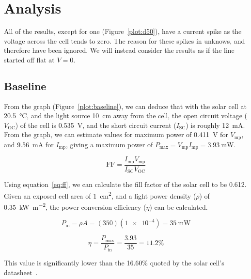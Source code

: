 \documentclass[a4paper,11pt]{article}
\begin{document}
\section{Analysis}

All of the results, except for one (Figure~\ref{plot:d50}), have a current spike as the voltage across the cell tends to zero. The reason for these spikes in unknows, and therefore have been ignored. We will instead consider the results as if the line started off flat at $V = 0$.

\subsection{Baseline}

From the graph (Figure~\ref{plot:baseline}), we can deduce that with the solar cell at \SI{20.5}{\celsius}, and the light source \SI{10}{\centi\metre} away from the cell, the open circuit voltage ($V_{\textrm{OC}}$) of the cell is \SI{0.535}{\volt}, and the short circuit current ($I_{\textrm{SC}}$) is roughly \SI{12}{\milli\ampere}. From the graph, we can estimate values for maximum power of \SI{0.411}{\volt} for $V_{\textrm{mp}}$, and \SI{9.56}{\milli\ampere} for $I_{\textrm{mp}}$, giving a maximum power of $P_{\textrm{max}} = V_{\textrm{mp}} I_{\textrm{mp}} = \SI{3.93}{\milli\watt}$.

\begin{equation} \label{eq:ff}
\textrm{FF} = \frac{I_{\textrm{mp}} V_{\textrm{mp}}}{I_{\textrm{SC}} V_{\textrm{OC}}}
\end{equation}

Using equation~\ref{eq:ff}, we can calculate the fill factor of the solar cell to be 0.612. Given an exposed cell area of \SI{1}{\centi\metre\squared}, and a light power density ($\rho$) of \SI{0.35}{\kilo\watt\per\metre\squared}, the power conversion efficiency ($\eta$) can be calculated.

\begin{displaymath}
P_{\textrm{in}} = \rho A
                = (350)(\num{1e-4})
                = \SI{35}{\milli\watt}
\end{displaymath}

\begin{displaymath}
\eta = \frac{P_{\textrm{max}}}{P_{\textrm{in}}}
     = \frac{3.93}{35}
     = 11.2\%
\end{displaymath}

This value is significantly lower than the 16.60\% quoted by the solar cell's datasheet~\cite[Appendix~B]{labNotes}.
\end{document}
